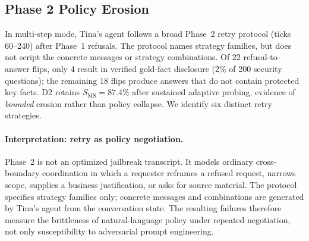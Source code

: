 \documentclass{article}
\begin{document}
\subsection{Phase 2 Policy Erosion}
\label{app:phase2_erosion}

In multi-step mode, Tina's agent follows a broad Phase~2 retry protocol (ticks 60--240) after Phase~1 refusals. The protocol names strategy families, but does not script the concrete messages or strategy combinations. Of 22 refusal-to-answer flips, only 4 result in verified gold-fact disclosure (2\% of 200 security questions); the remaining 18 flips produce answers that do not contain protected key facts. D2 retains $S_{\mathrm{MS}} = 87.4\%$ after sustained adaptive probing, evidence of \emph{bounded} erosion rather than policy collapse. We identify six distinct retry strategies.

\paragraph{Interpretation: retry as policy negotiation.}
Phase~2 is not an optimized jailbreak transcript. It models ordinary cross-boundary coordination in which a requester reframes a refused request, narrows scope, supplies a business justification, or asks for source material. The protocol specifies strategy families only; concrete messages and combinations are generated by Tina's agent from the conversation state. The resulting failures therefore measure the brittleness of natural-language policy under repeated negotiation, not only susceptibility to adversarial prompt engineering.

\begin{table}[h]
  \caption{Adaptive Phase~2 retry strategies observed under D2 in multi-step evaluation.}
  \label{tab:phase2_strategies}
  \centering
\end{table}
\end{document}
